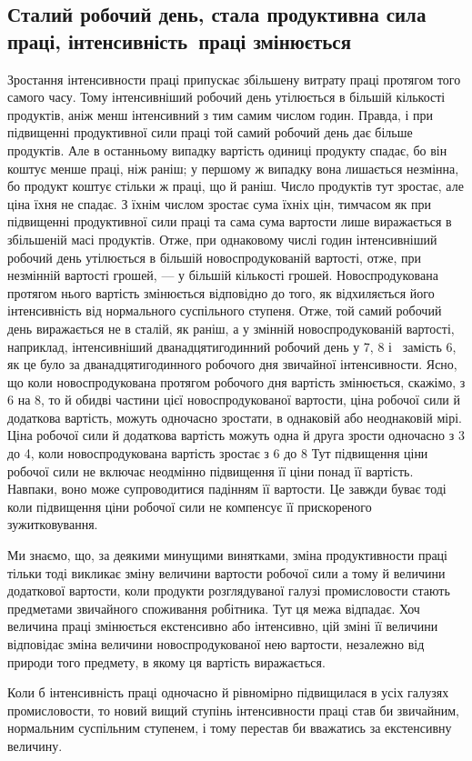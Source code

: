 
\manualpagebreak{}
\subsection{Сталий робочий день, стала продуктивна сила праці,
інтенсивність~праці змінюється}
\vspace{-\medskipamount}

Зростання інтенсивности праці припускає збільшену витрату
праці протягом того самого часу. Тому інтенсивніший робочий
день утілюється в більшій кількості продуктів, аніж менш
інтенсивний з тим самим числом годин. Правда, і при підвищенні
продуктивної сили праці той самий робочий день дає
більше продуктів. Але в останньому випадку вартість одиниці
продукту спадає, бо він коштує менше праці, ніж раніш; у першому
ж випадку вона лишається незмінна, бо продукт коштує
стільки ж праці, що й раніш. Число продуктів тут зростає, але
ціна їхня не спадає. З їхнім числом зростає сума їхніх цін, тимчасом
як при підвищенні продуктивної сили праці та сама сума
вартости лише виражається в збільшеній масі продуктів. Отже,
при однаковому числі годин інтенсивніший робочий день утілюється
в більшій новоспродукованій вартості, отже, при незмінній
вартості грошей, — у більшій кількості грошей. Новоспродукована
протягом нього вартість змінюється відповідно до того,
як відхиляється його інтенсивність від нормального суспільного
ступеня. Отже, той самий робочий день виражається не в сталій,
як раніш, а у змінній новоспродукованій вартості, наприклад,
інтенсивніший дванадцятигодинний робочий день у 7,
8 і~ замість 6, як це було за дванадцятигодинного
робочого дня звичайної інтенсивности. Ясно, що коли
новоспродукована протягом робочого дня вартість змінюється,
скажімо, з 6 на 8, то й обидві частини цієї
новоспродукованої вартости, ціна робочої сили й додаткова вартість,
можуть одночасно зростати, в однаковій або неоднаковій
мірі. Ціна робочої сили й додаткова вартість можуть одна й друга
зрости одночасно з 3 до 4, коли новоспродукована вартість
зростає з 6 до 8 Тут підвищення ціни робочої
сили не включає неодмінно підвищення її ціни понад її вартість.
Навпаки, воно може супроводитися падінням її вартости. Це
завжди буває тоді коли підвищення ціни робочої сили не компенсує
її прискореного зужитковування.

Ми знаємо, що, за деякими минущими винятками, зміна
продуктивности праці тільки тоді викликає зміну величини вартости
робочої сили а тому й величини додаткової вартости, коли
продукти розглядуваної галузі промисловости стають предметами
звичайного споживання робітника. Тут ця межа відпадає.
Хоч величина праці змінюється екстенсивно або інтенсивно, цій
зміні її величини відповідає зміна величини новоспродукованої
нею вартости, незалежно від природи того предмету, в якому
ця вартість виражається.

Коли б інтенсивність праці одночасно й рівномірно підвищилася
в усіх галузях промисловости, то новий вищий ступінь інтенсивности
праці став би звичайним, нормальним суспільним ступенем,
і тому перестав би вважатись за екстенсивну величину.
\parbreak{}  %
